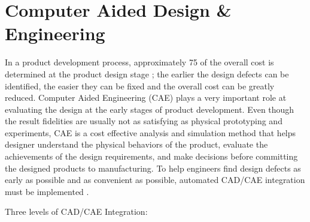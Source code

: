 \section{Computer Aided Design \& Engineering}
In a product development process, approximately 75 of the overall cost is determined at the product design stage \cite{Halpern1997}; the earlier the design defects can be identified, the easier they can be fixed and the overall cost can be greatly reduced.  
Computer Aided Engineering (CAE) plays a very important role at evaluating the design at the early stages of product development.  Even though the result fidelities are usually not  as  satisfying  as  physical  prototyping  and  experiments,  CAE  is  a  cost  effective analysis and simulation method that helps designer understand the physical behaviors of the product, evaluate the achievements of the design requirements, and make decisions before  committing  the  designed  products  to  manufacturing.    To help engineers find design defects as early as possible and as convenient as possible, automated CAD/CAE integration must be implemented \cite{Zeng2004}.

Three levels of CAD/CAE Integration:

